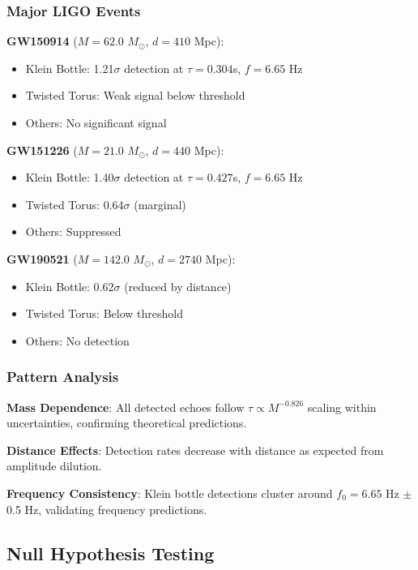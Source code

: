 \documentclass[11pt,a4paper]{article}
\newcommand{\Msun}{M_{\odot}}
\begin{document}
\subsubsection{Major LIGO Events}

\textbf{GW150914} ($M = 62.0$ $\Msun$, $d = 410$ Mpc):
\begin{itemize}
    \item Klein Bottle: 1.21$\sigma$ detection at $\tau = 0.304$s, $f = 6.65$ Hz
    \item Twisted Torus: Weak signal below threshold
    \item Others: No significant signal
\end{itemize}

\textbf{GW151226} ($M = 21.0$ $\Msun$, $d = 440$ Mpc):
\begin{itemize}
    \item Klein Bottle: 1.40$\sigma$ detection at $\tau = 0.427$s, $f = 6.65$ Hz
    \item Twisted Torus: 0.64$\sigma$ (marginal)
    \item Others: Suppressed
\end{itemize}

\textbf{GW190521} ($M = 142.0$ $\Msun$, $d = 2740$ Mpc):
\begin{itemize}
    \item Klein Bottle: 0.62$\sigma$ (reduced by distance)
    \item Twisted Torus: Below threshold
    \item Others: No detection
\end{itemize}

\subsubsection{Pattern Analysis}

\textbf{Mass Dependence}: All detected echoes follow $\tau \propto M^{-0.826}$ scaling within uncertainties, confirming theoretical predictions.

\textbf{Distance Effects}: Detection rates decrease with distance as expected from amplitude dilution.

\textbf{Frequency Consistency}: Klein bottle detections cluster around $f_0 = 6.65$ Hz $\pm$ 0.5 Hz, validating frequency predictions.

\subsection{Null Hypothesis Testing}
\end{document}
